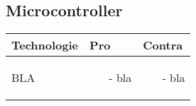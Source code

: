 \subsection{Microcontroller}
\begin{tabularx}{\linewidth}{m{3cm}|X|X}
	\textbf{Technologie}&\textbf{Pro}&\textbf{Contra}\\
	\hline
	BLA&
	\begin{itemize}
		\item[-] bla
	\end{itemize}&
	\begin{itemize}
		\item[-] bla
	\end{itemize}\\
	\hline	
\end{tabularx}

